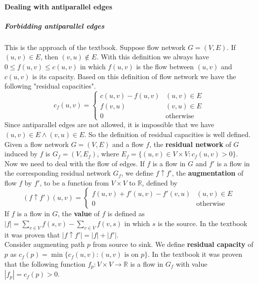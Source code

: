 \documentclass{book}
\begin{document}
	\paragraph{Dealing with antiparallel edges}
	\subparagraph{Forbidding antiparallel edges}
	This is the approach of the textbook. Suppose flow network $G = (V, E)$. If $(u, v) \in E$, then $(v, u) \not\in E$. With this definition we always have $0 \le f(u, v) \le c(u, v)$ in which $f(u, v)$ is the flow between $(u, v)$ and $c(u, v)$ is its capacity. Based on this definition of flow network we have the following "residual capacities".
	\begin{equation}
	\label{eq:ResidualCapacityNoAntiParallel}
	c_f(u, v) = \begin{cases}
	c(u, v) - f(u, v) & (u, v) \in E \\
	f(v, u) & (v, u) \in E \\
	0 & \text{otherwise}
	\end{cases}
	\end{equation}
	Since antiparallel edges are not allowed, it is impossible that we have $(u, v) \in E \land (v, u) \in E$. So the definition of residual capacities is well defined. Given a flow network $G = (V, E)$ and a flow $f$, the \textbf{residual network} of $G$ induced by $f$ is $G_f = (V, E_f)$, where $E_f = \{(u, v) \in V \times V : c_f(u, v) > 0\}$.\\
	Now we need to deal with the flow of edges. If $f$ is a flow in $G$ and $f'$ is a flow in the corresponding residual network $G_f$, we define $f \uparrow f'$, the \textbf{augmentation} of flow $f$ by $f'$, to be a function from $V \times V$ to $\mathbb{R}$, defined by
	\begin{equation}
	\label{eq:augmentationOfFlowNoAntiparallel}
		(f \uparrow f')(u, v) = \begin{cases}
		f(u, v) + f'(u, v) - f'(v, u) & (u, v) \in E \\
		0 & \text{otherwise}
		\end{cases}
	\end{equation}
	If $f$ is a flow in $G$, the \textbf{value} of $f$ is defined as $|f| = \sum_{v \in V}f(s, v) - \sum_{v \in V}f(v, s)$ in which $s$ is the source. In the textbook it was proven that $|f \uparrow f'| = |f| + |f'|$.\\
	Consider augmenting path $p$ from source to sink. We define \textbf{residual capacity} of $p$ as $c_f(p) = \min\{c_f(u, v) : (u, v) \text{ is on } p\}$. In the textbook it was proven that the following function $f_p : V \times V \rightarrow \mathbb{R}$ is a flow in $G_f$ with value $|f_p| = c_f(p) > 0$.
\end{document}
